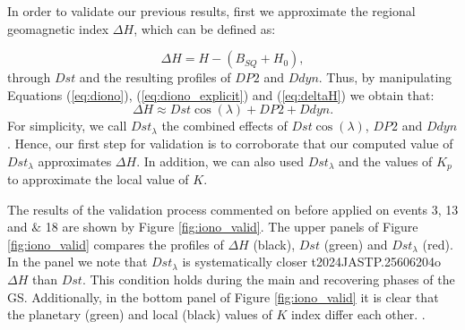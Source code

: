 \documentclass[a4paper,fleqn]{cas-dc}
\begin{document}
In order to validate our previous results, first we approximate the regional geomagnetic index $\Delta H$, which can be defined as:



\begin{equation}
    \label{eq:deltaH}
    \Delta H = H - (B_{SQ} + H_0),
\end{equation}
through $Dst$ and the resulting profiles of $DP2$ and $Ddyn$. Thus, by manipulating Equations (\ref{eq:diono}), (\ref{eq:diono_explicit}) and (\ref{eq:deltaH}) we obtain that:
\begin{equation}
    \label{eq:deltaHandDst}
    \Delta H \approx Dst \cos(\lambda) + DP2 + Ddyn.
\end{equation}
For simplicity, we call $ Dst_\lambda$ the combined effects of $ Dst\cos(\lambda)$, $DP2$ and $Ddyn$. Hence, our first step for validation is to corroborate that our computed value of $ Dst_\lambda$ approximates $\Delta H$. In addition, we can also used $ Dst_\lambda$ and the values of $K_p$ to approximate the local value of $K$.

The results of the validation process commented on before applied on events 3, 13 and $\&$ 18 are shown by Figure \ref{fig:iono_valid}. The upper panels of Figure \ref{fig:iono_valid} compares the profiles of $\Delta H$ (black), $Dst$ (green) and $Dst_\lambda$ (red). In the panel we note that $Dst_\lambda$ is systematically closer t2024JASTP.25606204o $\Delta H$ than $Dst$. This condition holds during the main and recovering phases of the GS. Additionally, in the bottom panel of Figure \ref{fig:iono_valid} it is clear that the planetary (green) and local (black) values of $K$ index differ each other. .

\end{document}
